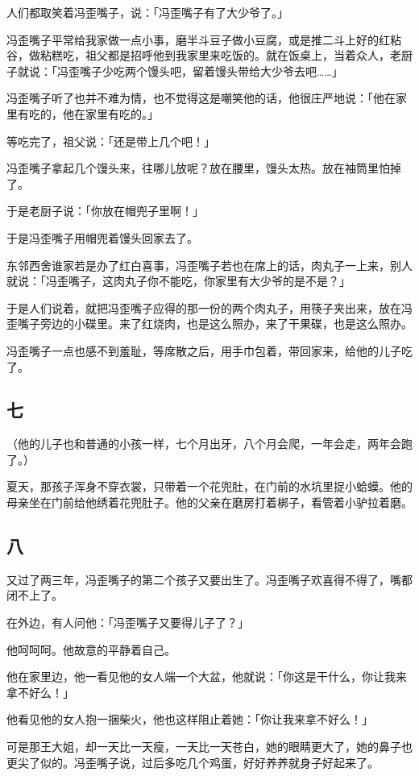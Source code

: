 \documentclass[UTF8]{ctexart}
\begin{document}
人们都取笑着冯歪嘴子，说：「冯歪嘴子有了大少爷了。」

冯歪嘴子平常给我家做一点小事，磨半斗豆子做小豆腐，或是推二斗上好的红粘谷，做粘糕吃，祖父都是招呼他到我家里来吃饭的。就在饭桌上，当着众人，老厨子就说：「冯歪嘴子少吃两个馒头吧，留着馒头带给大少爷去吧……」

冯歪嘴子听了也并不难为情，也不觉得这是嘲笑他的话，他很庄严地说：「他在家里有吃的，他在家里有吃的。」

等吃完了，祖父说：「还是带上几个吧！」

冯歪嘴子拿起几个馒头来，往哪儿放呢？放在腰里，馒头太热。放在袖筒里怕掉了。

于是老厨子说：「你放在帽兜子里啊！」

于是冯歪嘴子用帽兜着馒头回家去了。

东邻西舍谁家若是办了红白喜事，冯歪嘴子若也在席上的话，肉丸子一上来，别人就说：「冯歪嘴子，这肉丸子你不能吃，你家里有大少爷的是不是？」

于是人们说着，就把冯歪嘴子应得的那一份的两个肉丸子，用筷子夹出来，放在冯歪嘴子旁边的小碟里。来了红烧肉，也是这么照办，来了干果碟，也是这么照办。

冯歪嘴子一点也感不到羞耻，等席散之后，用手巾包着，带回家来，给他的儿子吃了。

\subsection{七}

（他的儿子也和普通的小孩一样，七个月出牙，八个月会爬，一年会走，两年会跑了。）

夏天，那孩子浑身不穿衣裳，只带着一个花兜肚，在门前的水坑里捉小蛤蟆。他的母亲坐在门前给他绣着花兜肚子。他的父亲在磨房打着梆子，看管着小驴拉着磨。

\subsection{八}

又过了两三年，冯歪嘴子的第二个孩子又要出生了。冯歪嘴子欢喜得不得了，嘴都闭不上了。

在外边，有人问他：「冯歪嘴子又要得儿子了？」

他呵呵呵。他故意的平静着自己。

他在家里边，他一看见他的女人端一个大盆，他就说：「你这是干什么，你让我来拿不好么！」

他看见他的女人抱一捆柴火，他也这样阻止着她：「你让我来拿不好么！」

可是那王大姐，却一天比一天瘦，一天比一天苍白，她的眼睛更大了，她的鼻子也更尖了似的。冯歪嘴子说，过后多吃几个鸡蛋，好好养养就身子好起来了。
\end{document}
